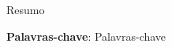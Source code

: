 
\begin{resumo}[RESUMO]
\begin{SingleSpacing}


Resumo 

\vspace{1cm}

\textbf{Palavras-chave}: Palavras-chave

\end{SingleSpacing}
\end{resumo}


